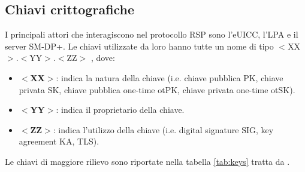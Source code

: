 \documentclass[10pt, oneside]{book}
\begin{document}
\subsection{Chiavi crittografiche}\label{sec:keys}
I principali attori che interagiscono nel protocollo RSP sono l'eUICC, l'LPA e il server SM-DP+. Le chiavi utilizzate da loro hanno tutte un nome di tipo $<$XX$>$.$<$YY$>$.$<$ZZ$>$ \cite{GSMA-docs-new}, dove:
\begin{itemize}
\item \textbf{$<$XX$>$}: indica la natura della chiave (i.e. chiave pubblica PK, chiave privata SK, chiave pubblica one-time otPK, chiave privata one-time otSK).
\item \textbf{$<$YY$>$}: indica il proprietario della chiave.
\item \textbf{$<$ZZ$>$}: indica l'utilizzo della chiave (i.e. digital signature SIG, key agreement KA, TLS).
\end{itemize}
Le chiavi di maggiore rilievo sono riportate nella tabella \ref{tab:keys} tratta da \cite{GSMA-docs-old}.
\end{document}
